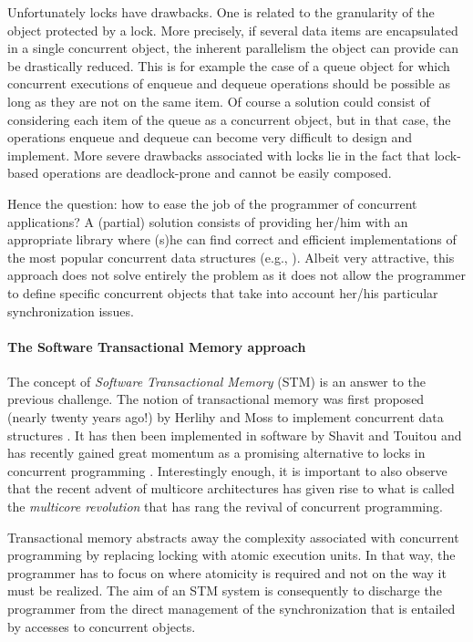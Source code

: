 Unfortunately locks have drawbacks. One is related to the  granularity
of the object protected by a lock. More precisely, if several data items 
are encapsulated  in a single  concurrent  object, the
inherent parallelism  the object can provide 
can be drastically reduced. This  is for example the case of a queue 
object for which concurrent executions of enqueue and dequeue operations 
should be possible as long as they are not on the same item.
Of  course  a   solution  could  consist of  considering  each item of the
queue as  a concurrent object, but in that case, the  operations  enqueue  
and  dequeue  can  become very   difficult  to  design and implement. 
More severe  drawbacks associated with locks lie in the fact that 
lock-based operations are deadlock-prone and cannot be easily composed. 

Hence  the question:  how to  ease  the  job of  the programmer  of
concurrent applications?
A (partial)  solution consists of providing her/him with an appropriate 
library where  (s)he  can  find  correct  and  efficient  implementations  of  
the most popular concurrent data structures (e.g., \cite{HS08,MS96}). 
Albeit very attractive, this approach does not solve entirely the problem  
as it does not allow the programmer to define  specific concurrent objects 
that take into account  her/his particular  synchronization issues. 


\paragraph{The Software Transactional Memory approach}
The concept of {\it Software Transactional  Memory}   (STM)  is  an answer  
to   the  previous  challenge.   The notion  of   transactional  memory  was
first   proposed  (nearly twenty years ago!) by Herlihy  and Moss to 
implement concurrent  data structures  \cite{HM93}.  It  has  then  been 
implemented in software  by Shavit  and  Touitou   \cite{ST97} and  has
recently gained great  momentum as  a promising alternative  to locks in
concurrent programming  \cite{FFGH08,H07,LK08,R08}. Interestingly  enough,  
it is important to also observe that the recent advent of multicore 
architectures has  given rise to what is called the {\it multicore  
revolution} \cite{HL08} that has  rang the revival of concurrent programming. 



Transactional  memory   abstracts away the  complexity associated with 
concurrent programming    by  replacing locking  with  atomic
execution units. In  that way, the programmer has to focus on  where 
atomicity is required and  not on the  way it must be realized. The aim of
an STM system is consequently  to  discharge the programmer from the direct 
management  of  the  synchronization  that  is entailed  by   accesses   to
concurrent  objects.  

